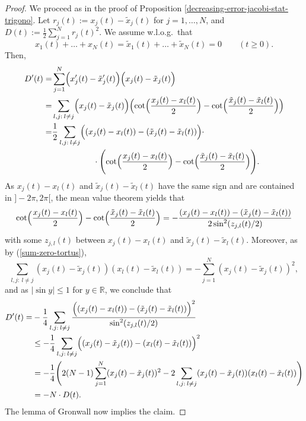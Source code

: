 \documentclass[reqno]{amsart}
\theoremstyle{plain}
\theoremstyle{definition}
\numberwithin{equation}{section}
\begin{document}
 \begin{proof} We proceed as in the proof of Proposition
 \ref{decreasing-error-jacobi-stat-trigono}.
   Let $r_j(t):=x_j(t)-\tilde x_j(t)$ for $j=1,\ldots,N$, and $D(t):=\frac{1}{2}\sum_{j=1}^N r_j(t)^2$.
   We assume w.l.o.g.~that
   \begin{equation}\label{sum-zero-tortus}
     x_1(t)+\ldots+x_N(t)=\tilde x_1(t)+\ldots+\tilde x_N(t)=0 \quad\quad(t\ge0).\end{equation}
   Then, 
\begin{align}
  D^\prime(t) = &
  \sum_{j=1}^N\Bigl( x_j^\prime(t)- \tilde x_j^\prime(t)\Bigr)\Bigl( x_j(t)- \tilde x_j(t)\Bigr)\notag\\
  =& \sum_{l,j: \> l\ne j}\Bigl( x_j(t)- \tilde x_j(t)\Bigr)\Bigl(\cot\Bigl(\frac{x_j(t)-x_l(t)}{2}\Bigr)
-\cot\Bigl(\frac{\tilde x_j(t)-\tilde x_l(t)}{2}\Bigr)\Bigr)\notag\\
=& \frac{1}{2}\sum_{l,j: \> l\ne j}\Bigl((x_j(t)-x_l(t))-(\tilde x_j(t)-\tilde x_l(t))\Bigr)\cdot\notag\\
&\quad\quad\quad\quad\quad
\cdot\Biggl(\cot\Bigl(\frac{x_j(t)-x_l(t)}{2}\Bigr)
 -\cot\Bigl(\frac{\tilde x_j(t)-\tilde x_l(t)}{2}\Bigr)\Biggr).\notag
 \end{align}
As $x_j(t)-x_l(t)$ and $\tilde x_j(t)-\tilde x_l(t)$ have the same sign and are contained in $]-2\pi,2\pi[$, the mean value theorem yields that
$$     \cot\Bigl(\frac{x_j(t)-x_l(t)}{2}\Bigr)-\cot\Bigl(\frac{\tilde x_j(t)-\tilde x_l(t)}{2}\Bigr)
                   =-\frac{   (x_j(t)-x_l(t))-(\tilde x_j(t)-\tilde x_l(t))    }{2\sin^2(z_{j,l}(t)/2)}$$
                   with some $z_{j,l}(t)$ between $x_j(t)-x_l(t)$ and $\tilde x_j(t)-\tilde x_l(t)$.
Moreover, as by (\ref{sum-zero-tortus}),
$$\sum_{l,j: \> l\ne j}(x_j(t)-\tilde x_j(t))(x_l(t)-\tilde x_l(t))=- \sum_{j=1}^N(x_j(t)-\tilde x_j(t))^2,$$
          and as  $|\sin y|\le 1$ for $y\in\mathbb R$, we conclude that        
\begin{align}
 D^\prime(t) = &-\frac{1}{4}\sum_{l,j: \> l\ne j}\frac{\Bigl((x_j(t)-x_l(t))-(\tilde x_j(t)-\tilde x_l(t))\Bigr)^2}{\sin^2(z_{j,l}(t)/2)}\notag\\
 &\le -\frac{1}{4}    \sum_{l,j: \> l\ne j}\Bigl((x_j(t)-\tilde x_j(t))- (x_l(t)-\tilde x_l(t))\Bigr)^2\notag\\
&=-\frac{1}{4}\Biggl( 2(N-1)\sum_{j=1}^N(x_j(t)-\tilde x_j(t))^2 -2\sum_{l,j: \> l\ne j}(x_j(t)-\tilde x_j(t))(x_l(t)-\tilde x_l(t))\Biggr)\notag\\
&=-N \cdot D(t).\notag\end{align}
 The lemma of Gronwall now implies the claim.
 \end{proof}
\end{document}
